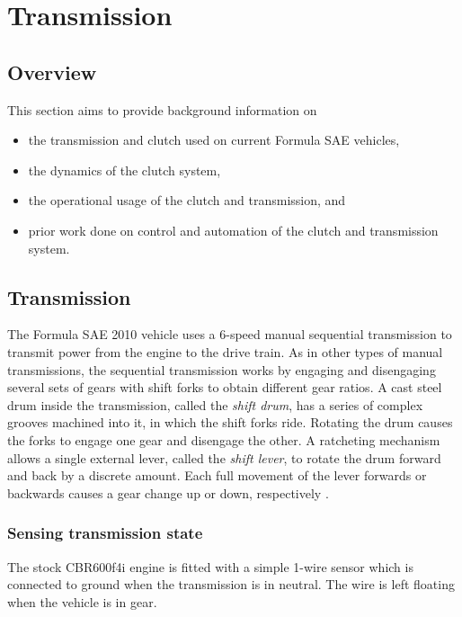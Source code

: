 \section{Transmission}

\subsection{Overview}

This section aims to provide background information on
\begin{itemize}
  \item the transmission and clutch used on current Formula SAE vehicles,
  \item the dynamics of the clutch system,
  \item the operational usage of the clutch and transmission, and
  \item prior work done on control and automation of the clutch and transmission system.
\end{itemize}

\subsection{Transmission}

The Formula SAE 2010 vehicle uses a 6-speed manual sequential transmission to transmit power from the engine to the drive train. As in other types of manual transmissions, the sequential transmission works by engaging and disengaging several sets of gears with shift forks to obtain different gear ratios. A cast steel drum inside the transmission, called the \emph{shift drum}, has a series of complex grooves machined into it, in which the shift forks ride. Rotating the drum causes the forks to engage one gear and disengage the other. A ratcheting mechanism allows a single external lever, called the \emph{shift lever}, to rotate the drum forward and back by a discrete amount. Each full movement of the lever forwards or backwards causes a gear change up or down, respectively \cite{HowtoManualTransmission, cbr600}.

\subsubsection{Sensing transmission state}

The stock CBR600f4i engine is fitted with a simple 1-wire sensor which is connected to ground when the transmission is in neutral. The wire is left floating when the vehicle is in gear.

